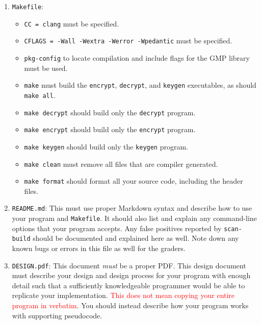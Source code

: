 \begin{enumerate}
  \item \texttt{Makefile}:
    \begin{itemize}
      \item \texttt{CC = clang} must be specified.

      \item \texttt{CFLAGS = -Wall -Wextra -Werror -Wpedantic} must be specified.

      \item \texttt{pkg-config} to locate compilation and include flags
        for the GMP library must be used.

      \item \texttt{make} must build the \texttt{encrypt},
        \texttt{decrypt}, and \texttt{keygen}
        executables, as should \texttt{make all}.

      \item \texttt{make decrypt} should build only the \texttt{decrypt}
        program.

      \item \texttt{make encrypt} should build only the \texttt{encrypt}
        program.

      \item \texttt{make keygen} should build only the \texttt{keygen}
        program.

      \item \texttt{make clean} must remove all files that are compiler
        generated.

      \item \texttt{make format} should format all your source code,
        including the header files.
    \end{itemize}

  \item \texttt{README.md}: This must use proper Markdown syntax and
    describe how to use your program and \texttt{Makefile}. It should
    also list and explain any command-line options that your program
    accepts. Any false positives reported by \texttt{scan-build} should
    be documented and explained here as well. Note down any known bugs
    or errors in this file as well for the graders.

  \item \texttt{DESIGN.pdf}: This document \emph{must} be a proper
    PDF\@. This design document must describe your design and design
    process for your program with enough detail such that a sufficiently
    knowledgeable programmer would be able to replicate your
    implementation. \textcolor{red}{This does not mean copying your
    entire program in verbatim}. You should instead describe how your
    program works with supporting pseudocode.
\end{enumerate}
